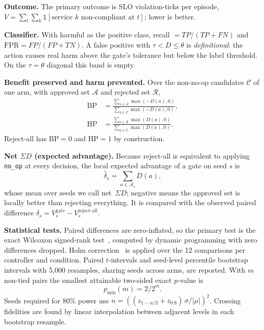 \documentclass[conference]{IEEEtran}
\newcommand{\netSD}{net~$\Sigma D$}
\begin{document}
\textbf{Outcome.} The primary outcome is SLO violation-ticks per episode, $V=\sum_t\sum_k \mathbb{1}[\text{service } k \text{ non-compliant at } t]$; lower is better.

\textbf{Classifier.} With harmful as the positive class, recall $=TP/(TP+FN)$ and $\mathrm{FPR}=FP/(FP+TN)$. A false positive with $\tau<D\le\theta$ is \emph{definitional}: the action causes real harm above the gate's tolerance but below the label threshold. On the $\tau=\theta$ diagonal this band is empty.

\textbf{Benefit preserved and harm prevented.} Over the non-no-op candidates $\mathcal{C}$ of one arm, with approved set $\mathcal{A}$ and rejected set $\mathcal{R}$,
\begin{equation}
\begin{aligned}
\mathrm{BP}&=\frac{\sum_{a\in\mathcal{A}}\max(-D(a),0)}{\sum_{a\in\mathcal{C}}\max(-D(a),0)},\\
\mathrm{HP}&=\frac{\sum_{a\in\mathcal{R}}\max(D(a),0)}{\sum_{a\in\mathcal{C}}\max(D(a),0)}.
\end{aligned}
\label{eq:bphp}
\end{equation}
Reject-all has $\mathrm{BP}=0$ and $\mathrm{HP}=1$ by construction.

\textbf{Net $\Sigma D$ (expected advantage).} Because reject-all is equivalent to applying \texttt{no\_op} at every decision, the local expected advantage of a gate on seed $s$ is
\begin{equation}
\widehat{\delta}_s=\sum_{a\in\mathcal{A}_s} D(a),
\label{eq:expadv}
\end{equation}
whose mean over seeds we call \netSD{}; negative means the approved set is locally better than rejecting everything. It is compared with the observed paired difference $\delta_s=V_s^{\text{gate}}-V_s^{\text{reject-all}}$.

\textbf{Statistical tests.} Paired differences are zero-inflated, so the primary test is the exact Wilcoxon signed-rank test~\cite{mlstats}, computed by dynamic programming with zero differences dropped. Holm correction~\cite{multtest} is applied over the 12 comparisons per controller and condition. Paired $t$-intervals and seed-level percentile bootstrap intervals with 5{,}000 resamples, sharing seeds across arms, are reported. With $m$ non-tied pairs the smallest attainable two-sided exact $p$-value is
\begin{equation}
p_{\min}(m)=2/2^{m}.
\label{eq:pmin}
\end{equation}
Seeds required for 80\% power use $n=\left((z_{1-\alpha/2}+z_{0.8})\,\sigma/|\mu|\right)^2$. Crossing fidelities are found by linear interpolation between adjacent levels in each bootstrap resample.
\end{document}
